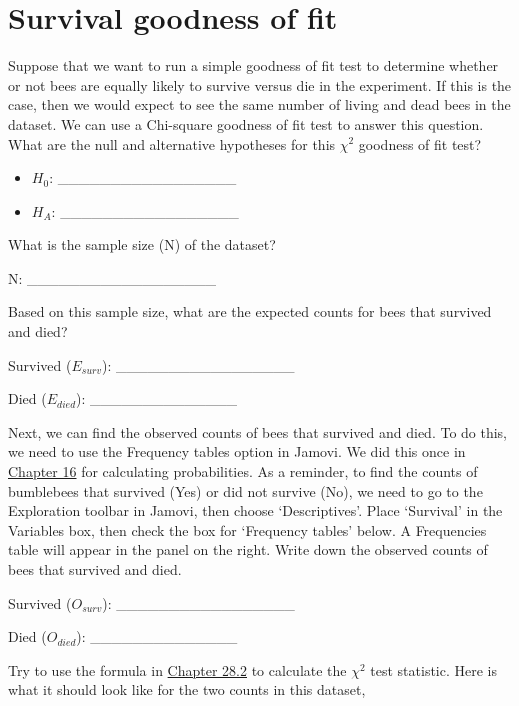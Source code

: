 \documentclass[
]{scrbook}
\begin{document}
\hypertarget{survival-goodness-of-fit}{%
\section{Survival goodness of fit}\label{survival-goodness-of-fit}}

Suppose that we want to run a simple goodness of fit test to determine whether or not bees are equally likely to survive versus die in the experiment.
If this is the case, then we would expect to see the same number of living and dead bees in the dataset.
We can use a Chi-square goodness of fit test to answer this question.
What are the null and alternative hypotheses for this \(\chi^{2}\) goodness of fit test?

\begin{itemize}
\item
  \(H_{0}\): \_\_\_\_\_\_\_\_\_\_\_\_\_\_\_\_\_
\item
  \(H_{A}\): \_\_\_\_\_\_\_\_\_\_\_\_\_\_\_\_\_
\end{itemize}

What is the sample size (N) of the dataset?

N: \_\_\_\_\_\_\_\_\_\_\_\_\_\_\_\_\_\_

Based on this sample size, what are the expected counts for bees that survived and died?

Survived (\(E_{surv}\)): \_\_\_\_\_\_\_\_\_\_\_\_\_\_\_\_\_

Died (\(E_{died}\)): \_\_\_\_\_\_\_\_\_\_\_\_\_\_

Next, we can find the observed counts of bees that survived and died.
To do this, we need to use the Frequency tables option in Jamovi.
We did this once in \protect\hyperlink{Chapter_16}{Chapter 16} for calculating probabilities.
As a reminder, to find the counts of bumblebees that survived (Yes) or did not survive (No), we need to go to the Exploration toolbar in Jamovi, then choose `Descriptives'.
Place `Survival' in the Variables box, then check the box for `Frequency tables' below.
A Frequencies table will appear in the panel on the right.
Write down the observed counts of bees that survived and died.

Survived (\(O_{surv}\)): \_\_\_\_\_\_\_\_\_\_\_\_\_\_\_\_\_

Died (\(O_{died}\)): \_\_\_\_\_\_\_\_\_\_\_\_\_\_

Try to use the formula in \protect\hyperlink{chi-squared-goodness-of-fit}{Chapter 28.2} to calculate the \(\chi^{2}\) test statistic.
Here is what it should look like for the two counts in this dataset,
\end{document}
